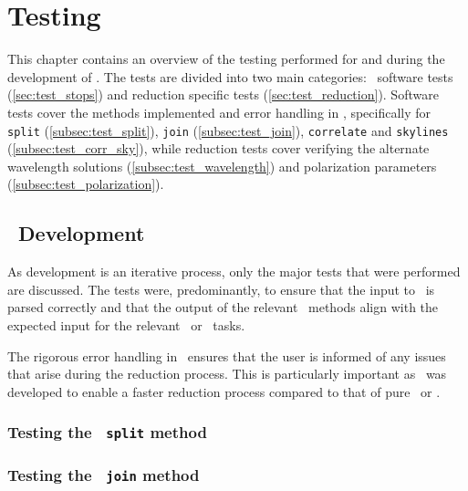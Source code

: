 \chapter{Testing}

This chapter contains an overview of the testing performed for and during the development of \stops. The tests are divided into two main categories: \stops\ software tests (\autoref{sec:test_stops}) and reduction specific tests (\autoref{sec:test_reduction}). Software tests cover the methods implemented and error handling in \stops, specifically for \texttt{split} (\autoref{subsec:test_split}), \texttt{join} (\autoref{subsec:test_join}), \texttt{correlate} and \texttt{skylines} (\autoref{subsec:test_corr_sky}), while reduction tests cover verifying the alternate wavelength solutions (\autoref{subsec:test_wavelength}) and polarization parameters (\autoref{subsec:test_polarization}).

\section{\stops\ Development} \label{sec:test_stops}

As development is an iterative process, only the major tests that were performed are discussed. The tests were, predominantly, to ensure that the input to \stops\ is parsed correctly and that the output of the relevant \stops\ methods align with the expected input for the relevant \iraf\ or \polsalt\ tasks.

The rigorous error handling in \stops\ ensures that the user is informed of any issues that arise during the reduction process. This is particularly important as \stops\ was developed to enable a faster reduction process compared to that of pure \iraf\ or \polsalt.



\subsection{Testing the \stops\ \texttt{split} method} \label{subsec:test_split}


\subsection{Testing the \stops\ \texttt{join} method} \label{subsec:test_join}

